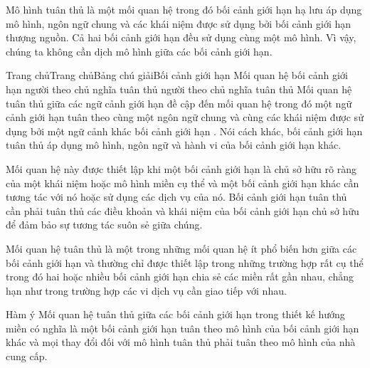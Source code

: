 Mô hình tuân thủ là một mối quan hệ trong đó bối cảnh giới hạn hạ lưu áp dụng mô hình, ngôn ngữ chung và các khái niệm được sử dụng bởi bối cảnh giới hạn thượng nguồn.
Cả hai bối cảnh giới hạn đều sử dụng cùng một mô hình. Vì vậy, chúng ta không cần dịch mô hình giữa các bối cảnh giới hạn.


Trang chủTrang chủBảng chú giảiBối cảnh giới hạn Mối quan hệ bối cảnh giới hạn người theo chủ nghĩa tuân thủ
người theo chủ nghĩa tuân thủ
Mối quan hệ tuân thủ giữa các ngữ cảnh giới hạn đề cập đến mối quan hệ trong đó một ngữ cảnh giới hạn tuân theo cùng một ngôn ngữ chung và cùng các khái niệm được sử dụng bởi một ngữ cảnh khác bối cảnh giới hạn . Nói cách khác, bối cảnh giới hạn tuân thủ áp dụng mô hình, ngôn ngữ và hành vi của bối cảnh giới hạn khác.

Mối quan hệ này được thiết lập khi một bối cảnh giới hạn là chủ sở hữu rõ ràng của một khái niệm hoặc mô hình miền cụ thể và một bối cảnh giới hạn khác cần tương tác với nó hoặc sử dụng các dịch vụ của nó. Bối cảnh giới hạn tuân thủ cần phải tuân thủ các điều khoản và khái niệm của bối cảnh giới hạn chủ sở hữu để đảm bảo sự tương tác suôn sẻ giữa chúng.

Mối quan hệ tuân thủ là một trong những mối quan hệ ít phổ biến hơn giữa các bối cảnh giới hạn và thường chỉ được thiết lập trong những trường hợp rất cụ thể trong đó hai hoặc nhiều bối cảnh giới hạn chia sẻ các miền rất gần nhau, chẳng hạn như trong trường hợp các vi dịch vụ cần giao tiếp với nhau.

Hàm ý
Mối quan hệ tuân thủ giữa các bối cảnh giới hạn trong thiết kế hướng miền có nghĩa là một bối cảnh giới hạn tuân theo mô hình của bối cảnh giới hạn khác và mọi thay đổi đối với mô hình tuân thủ phải tuân theo mô hình của nhà cung cấp.

